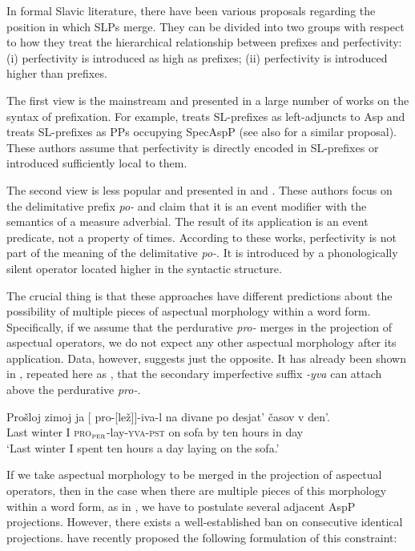 \documentclass[output=paper,
]{langscibook}
\begin{document}
In formal Slavic literature, there have been various proposals regarding the position in which SLPs merge. They can be divided into two groups with respect to how they treat the hierarchical relationship between prefixes and perfectivity: (i) perfectivity is introduced as high as prefixes; (ii) perfectivity is introduced higher than prefixes.

The first view is the mainstream and presented in a large number of works on the syntax of prefixation. For example, \citep{babko1999zero} treats SL-prefixes as left-adjuncts to Asp and \cite{svenonius2004slavic} treats SL-prefixes as PPs occupying SpecAspP (see also \citealt{ramchand2005time} for a similar proposal). These authors assume that perfectivity is directly encoded in SL-prefixes or introduced sufficiently local to them.

The second view is less popular and presented in \citet{pinon1994} and \citet{filip2000quantization, filip2005measures,filip2008events}. These authors focus on the delimitative prefix \textit{po-} and claim that it is an event modifier with the semantics of a measure adverbial. The result of its application is an event predicate, not a property of times. According to these works, perfectivity is not part of the meaning of the delimitative \textit{po-}. It is introduced by a phonologically silent operator located higher in the syntactic structure.

The crucial thing is that these approaches have different predictions about the possibility of multiple pieces of aspectual morphology within a word form. Specifically, if we assume that the perdurative \textit{pro-} merges in the projection of aspectual operators, we do not expect any other aspectual morphology after its application. Data, however, suggests just the opposite. It has already been shown in , repeated here as , that the secondary imperfective suffix \textit{-yva} can attach above the perdurative \textit{pro-}.

\ea \label{ex:naumov:19}
\gll Prošloj	zimoj	ja	[\hspace{-2pt} pro-[lež]]-iva-l	   na	divane	   po	desjat’ časov	v	den’. \\
Last	winter	I   {}	\textsc{pro}$_\textsc{per}$-lay-\textsc{yva}-\textsc{pst}	   on	sofa	   by	ten hours	in	day \\
\glt `Last winter I spent ten hours a day laying on the sofa.'
\z

\noindent If we take aspectual morphology to be merged in the projection of aspectual operators, then in the case when there are multiple pieces of this morphology within a word form, as in , we have to postulate several adjacent AspP projections. However, there exists a well-established ban on consecutive identical projections. \citet{de2018negation} have recently proposed the following formulation of this constraint:
\end{document}
